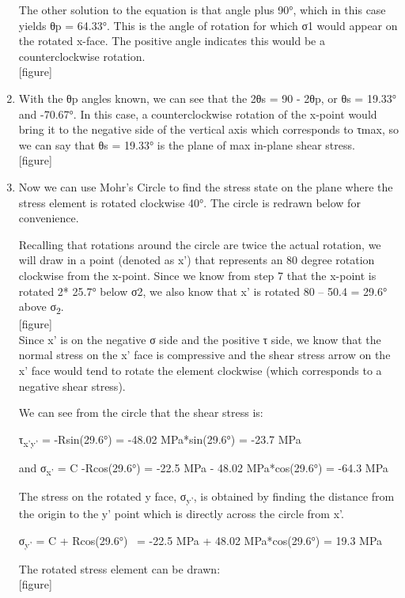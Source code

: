 \documentclass[
  letterpaper,
  DIV=11,
  numbers=noendperiod]{scrreprt}
\begin{document}
\begin{tcolorbox}
\begin{tcolorbox}
\begin{enumerate}
  The other solution to the equation is that angle plus 90°, which in
  this case yields θp = 64.33°. This is the angle of rotation for which
  σ1 would appear on the rotated x-face. The positive angle indicates
  this would be a counterclockwise rotation.\\
  {[}figure{]}
\item
  With the θp angles known, we can see that the 2θs = 90 - 2θp, or θs =
  19.33° and -70.67°. In this case, a counterclockwise rotation of the
  x-point would bring it to the negative side of the vertical axis which
  corresponds to τmax, so we can say that θs = 19.33° is the plane of
  max in-plane shear stress.\\
  {[}figure{]}
\item
  Now we can use Mohr's Circle to find the stress state on the plane
  where the stress element is rotated clockwise 40°. The circle is
  redrawn below for convenience.

  Recalling that rotations around the circle are twice the actual
  rotation, we will draw in a point (denoted as x') that represents an
  80 degree rotation clockwise from the x-point. Since we know from step
  7 that the x-point is rotated 2* 25.7° below σ2, we also know that x'
  is rotated 80 -- 50.4 = 29.6° above σ\textsubscript{2}.\\
  {[}figure{]}\\
  Since x' is on the negative σ side and the positive τ side, we know
  that the normal stress on the x' face is compressive and the shear
  stress arrow on the x' face would tend to rotate the element clockwise
  (which corresponds to a negative shear stress).

  We can see from the circle that the shear stress is:

  τ\textsubscript{x'y'} = -Rsin(29.6°) = -48.02 MPa*sin(29.6°) = -23.7
  MPa

  and σ\textsubscript{x'} = C -Rcos(29.6°) = -22.5 MPa - 48.02
  MPa*cos(29.6°) = -64.3 MPa

  The stress on the rotated y face, σ\textsubscript{y'}, is obtained by
  finding the distance from the origin to the y' point which is directly
  across the circle from x'.

  σ\textsubscript{y'} = C + Rcos(29.6°) ~= -22.5 MPa + 48.02
  MPa*cos(29.6°) = 19.3 MPa

  The rotated stress element can be drawn:\\
  {[}figure{]}
\end{enumerate}


\end{tcolorbox}
\end{tcolorbox}
\end{document}
